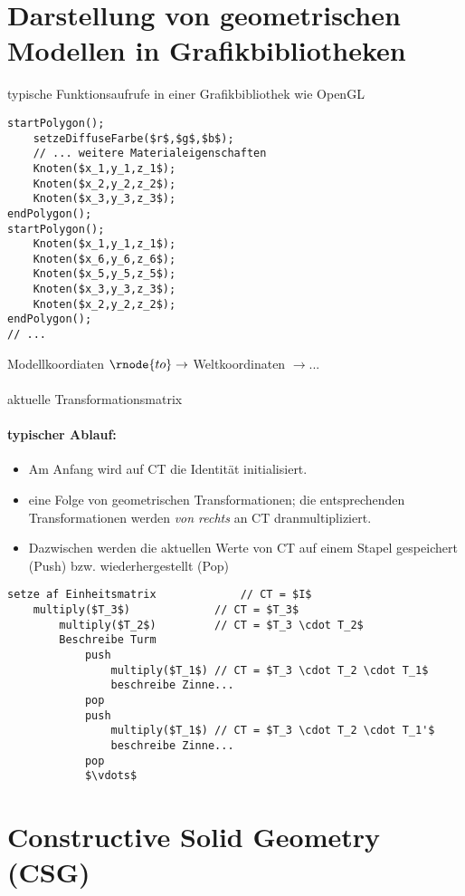 \section{Darstellung von geometrischen Modellen in Grafikbibliotheken}
\begin{center}
\end{center}
typische Funktionsaufrufe in einer Grafikbibliothek wie OpenGL
\begin{lstlisting}
startPolygon();
	setzeDiffuseFarbe($r$,$g$,$b$);
	// ... weitere Materialeigenschaften
	Knoten($x_1,y_1,z_1$);
	Knoten($x_2,y_2,z_2$);
	Knoten($x_3,y_3,z_3$);
endPolygon();
startPolygon();
	Knoten($x_1,y_1,z_1$);
	Knoten($x_6,y_6,z_6$);
	Knoten($x_5,y_5,z_5$);
	Knoten($x_3,y_3,z_3$);
	Knoten($x_2,y_2,z_2$);
endPolygon();
// ...
\end{lstlisting}
\begin{center}
Modellkoordiaten $\rnode{to}\rightarrow$ Weltkoordinaten {\color{gray}$\rightarrow ...$}\\[2em]
\\
aktuelle Transformationsmatrix
\end{center}
\paragraph*{typischer Ablauf: }
\begin{itemize}
\item Am Anfang wird auf CT die Identität initialisiert.
\item eine Folge von geometrischen Transformationen; die entsprechenden Transformationen werden \emph{von rechts}
	an CT dranmultipliziert.
\item Dazwischen werden die aktuellen Werte von CT auf einem Stapel gespeichert (Push) bzw. wiederhergestellt (Pop)
\end{itemize}
\begin{center}
\end{center}
\begin{lstlisting}
setze af Einheitsmatrix				// CT = $I$
	multiply($T_3$)				// CT = $T_3$
		multiply($T_2$)			// CT = $T_3 \cdot T_2$
		Beschreibe Turm
			push
				multiply($T_1$)	// CT = $T_3 \cdot T_2 \cdot T_1$
				beschreibe Zinne...
			pop
			push
				multiply($T_1$)	// CT = $T_3 \cdot T_2 \cdot T_1'$
				beschreibe Zinne...
			pop
			$\vdots$
\end{lstlisting}

\section{Constructive Solid Geometry (CSG)}
